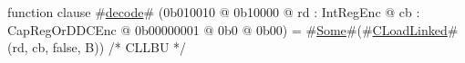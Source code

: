 function clause #\hyperref[sailMIPSzdecode]{decode}# (0b010010 @ 0b10000 @ rd : IntRegEnc @ cb : CapRegOrDDCEnc @ 0b00000001 @ 0b0 @ 0b00) = #\hyperref[sailMIPSzSome]{Some}#(#\hyperref[sailMIPSzCLoadLinked]{CLoadLinked}#(rd, cb, false, B)) /* CLLBU */
